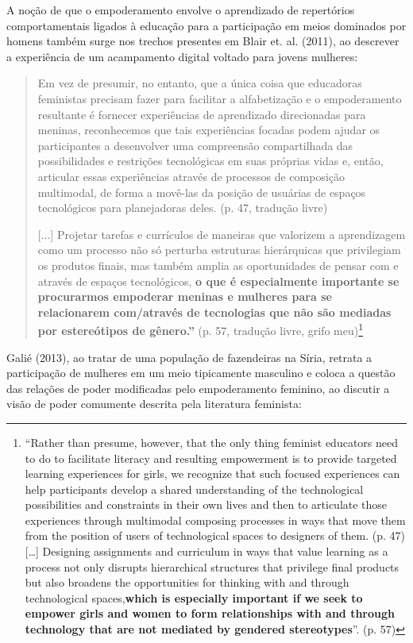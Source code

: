 A noção de que o empoderamento envolve o aprendizado de repertórios comportamentais ligados à educação para a participação em meios dominados por homens também surge nos trechos presentes em Blair et. al. (2011), ao descrever a experiência de um acampamento digital voltado para jovens mulheres:

\begin{quote}
    Em vez de presumir, no entanto, que a única coisa que educadoras feministas precisam fazer para facilitar a alfabetização e o empoderamento resultante é fornecer experiências de aprendizado direcionadas para meninas, reconhecemos que tais experiências focadas podem ajudar os participantes a desenvolver uma compreensão compartilhada das possibilidades e restrições tecnológicas em suas próprias vidas e, então, articular essas experiências através de processos de composição multimodal, de forma a movê-las da posição de usuárias de espaços tecnológicos para planejadoras deles. (p. 47, tradução livre) 

    [...] Projetar tarefas e currículos de maneiras que valorizem a aprendizagem como um processo não só perturba estruturas hierárquicas que privilegiam os produtos finais, mas também amplia as oportunidades de pensar com e através de espaços tecnológicos, \textbf{o que é especialmente importante se procurarmos empoderar meninas e mulheres para se relacionarem com/através de tecnologias que não são mediadas por estereótipos de gênero.''} (p. 57, tradução livre, grifo meu)\footnote{``Rather than presume, however, that the only thing feminist educators need to do to facilitate literacy and resulting empowerment is to provide targeted learning experiences for girls, we recognize that such focused experiences can help participants develop a shared understanding of the technological possibilities and constraints in their own lives and then to articulate those experiences through multimodal composing processes in ways that move them from the position of users of technological spaces to designers of them. (p. 47) […] Designing assignments and curriculum in ways that value learning as a process not only disrupts hierarchical structures that privilege final products but also broadens the opportunities for thinking with and through technological spaces,\textbf{which is especially important if we seek to empower girls and women to form relationships with and through technology that are not mediated by gendered stereotypes}''. (p. 57)}
\end{quote}

Galié (2013), ao tratar de uma população de fazendeiras na Síria, retrata a participação de mulheres em um meio tipicamente masculino e coloca a questão das relações de poder modificadas pelo empoderamento feminino, ao discutir a visão de poder comumente descrita pela literatura feminista:

